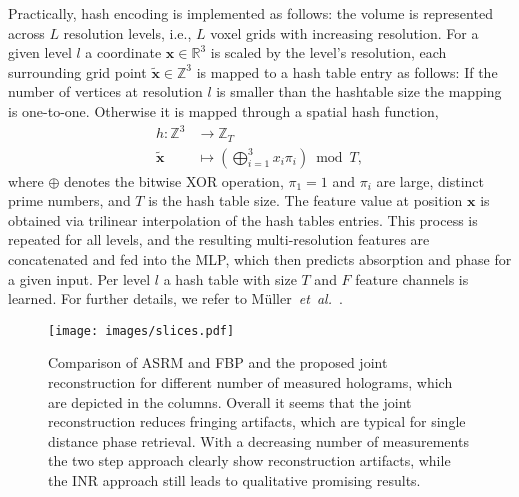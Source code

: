 \documentclass{article}
\begin{document}
Practically, hash encoding is implemented as follows:  
the volume is represented across $L$ resolution levels, i.e., $L$ voxel grids with increasing resolution.  
For a given level $l$ a coordinate $\mathbf{x} \in \mathbb{R}^{3}$ is scaled by the level's resolution, each surrounding grid point $\tilde{\mathbf{x}} \in \mathbb{Z}^{3}$ is mapped to a hash table entry as follows:
If the number of vertices at resolution $l$ is smaller than the hashtable size the mapping is one-to-one.
Otherwise it is mapped through a spatial hash function,
\begin{equation}
\begin{split}
h : \mathbb{Z}^{3} &\rightarrow \mathbb{Z}_{T} \\
\tilde{\mathbf{x}} &\mapsto \left( \bigoplus_{i=1}^{3} x_{i} \pi_{i} \right) \bmod T,
\end{split}
\end{equation}
where $\oplus$ denotes the bitwise XOR operation, $\pi_{1}=1$ and $\pi_{i}$ are large, distinct prime numbers, and $T$ is the hash table size.  
The feature value at position $\mathbf{x}$ is obtained via trilinear interpolation of the hash tables entries.  
This process is repeated for all levels, and the resulting multi-resolution features are concatenated and fed into the MLP, which then predicts absorption and phase for a given input.
Per level $l$ a hash table with size $T$ and $F$ feature channels is learned.  
For further details, we refer to Müller~\textit{et~al.}~\cite{mullerInstantNeuralGraphics2022}.  


\begin{figure*}
	\centering
	\texttt{[image: images/slices.pdf]}
	\caption{
		Comparison of ASRM and FBP and the proposed joint reconstruction for different number of measured holograms, which are depicted in the columns.
		Overall it seems that the joint reconstruction reduces fringing artifacts, which are typical for single distance phase retrieval.
		With a decreasing number of measurements the two step approach clearly show reconstruction artifacts, while the INR approach still leads to qualitative promising results.
	}
	\label{fig:slice}
\end{figure*}
\end{document}

